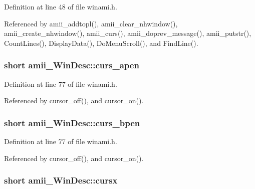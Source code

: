 Definition at line 48 of file winami.\+h.



Referenced by amii\+\_\+addtopl(), amii\+\_\+clear\+\_\+nhwindow(), amii\+\_\+create\+\_\+nhwindow(), amii\+\_\+curs(), amii\+\_\+doprev\+\_\+message(), amii\+\_\+putstr(), Count\+Lines(), Display\+Data(), Do\+Menu\+Scroll(), and Find\+Line().

\hypertarget{structamii__WinDesc_a101774acf6a2657276007d298c36609d}{
\subsubsection[{curs\+\_\+apen}]{\setlength{\rightskip}{0pt plus 5cm}short amii\+\_\+\+Win\+Desc\+::curs\+\_\+apen}}\label{structamii__WinDesc_a101774acf6a2657276007d298c36609d}


Definition at line 77 of file winami.\+h.



Referenced by cursor\+\_\+off(), and cursor\+\_\+on().

\hypertarget{structamii__WinDesc_a93ca00f32977372698256e74df4af3c4}{
\subsubsection[{curs\+\_\+bpen}]{\setlength{\rightskip}{0pt plus 5cm}short amii\+\_\+\+Win\+Desc\+::curs\+\_\+bpen}}\label{structamii__WinDesc_a93ca00f32977372698256e74df4af3c4}


Definition at line 77 of file winami.\+h.



Referenced by cursor\+\_\+off(), and cursor\+\_\+on().

\hypertarget{structamii__WinDesc_ae9b81e1924a60034c9ca2f7dee3c97fd}{
\subsubsection[{cursx}]{\setlength{\rightskip}{0pt plus 5cm}short amii\+\_\+\+Win\+Desc\+::cursx}}\label{structamii__WinDesc_ae9b81e1924a60034c9ca2f7dee3c97fd}


